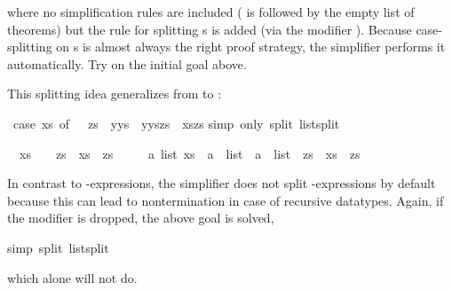 \begin{isabellebody}
\begin{isamarkuptxt}
\begin{isabelle}
\end{isabelle}
where no simplification rules are included ( is followed by the
empty list of theorems) but the rule  for
splitting s is added (via the modifier ). Because
case-splitting on s is almost always the right proof strategy, the
simplifier performs it automatically. Try 
on the initial goal above.

This splitting idea generalizes from  to :%
\end{isamarkuptxt}%
\isanewline
{}\ {\isachardoublequote}{\isacharparenleft}case\ xs\ of\ {\isacharbrackleft}{\isacharbrackright}\ {\isasymRightarrow}\ zs\ {\isacharbar}\ y{\isacharhash}ys\ {\isasymRightarrow}\ y{\isacharhash}{\isacharparenleft}ys{\isacharat}zs{\isacharparenright}{\isacharparenright}\ {\isacharequal}\ xs{\isacharat}zs{\isachardoublequote}\isanewline
{}simp\ only{\isacharcolon}\ split{\isacharcolon}\ list{\isachardot}split{\isacharparenright}%
\begin{isamarkuptxt}%
\begin{isabelle}%
\ {}{\isachardot}\ {\isacharparenleft}xs\ {\isacharequal}\ {\isacharbrackleft}{\isacharbrackright}\ {\isasymlongrightarrow}\ zs\ {\isacharequal}\ xs\ {\isacharat}\ zs{\isacharparenright}\ {\isasymand}\isanewline
\ \ \ \ {\isacharparenleft}{\isasymforall}a\ list{\isachardot}\ xs\ {\isacharequal}\ a\ {\isacharhash}\ list\ {\isasymlongrightarrow}\ a\ {\isacharhash}\ list\ {\isacharat}\ zs\ {\isacharequal}\ xs\ {\isacharat}\ zs{\isacharparenright}%
\end{isabelle}
In contrast to -expressions, the simplifier does not split
-expressions by default because this can lead to nontermination
in case of recursive datatypes. Again, if the  modifier is
dropped, the above goal is solved,%
\end{isamarkuptxt}%
simp\ split{\isacharcolon}\ list{\isachardot}split{\isacharparenright}%
\begin{isamarkuptext}%
\noindent%
which  alone will not do.


\end{isamarkuptext}
\end{isabellebody}

